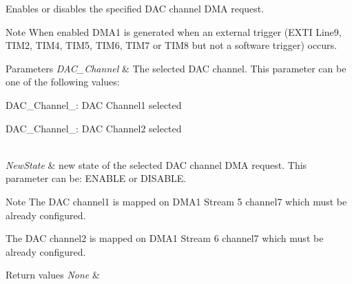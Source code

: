 Enables or disables the specified D\+AC channel D\+MA request. 

\begin{DoxyNote}{Note}
When enabled D\+M\+A1 is generated when an external trigger (E\+X\+TI Line9, T\+I\+M2, T\+I\+M4, T\+I\+M5, T\+I\+M6, T\+I\+M7 or T\+I\+M8 but not a software trigger) occurs. 
\end{DoxyNote}

\begin{DoxyParams}{Parameters}
{\em D\+A\+C\+\_\+\+Channel} & The selected D\+AC channel. This parameter can be one of the following values\+: \begin{DoxyItemize}
\item D\+A\+C\+\_\+\+Channel\+\_\+: D\+AC Channel1 selected \item D\+A\+C\+\_\+\+Channel\+\_\+: D\+AC Channel2 selected \end{DoxyItemize}
\\
\hline
{\em New\+State} & new state of the selected D\+AC channel D\+MA request. This parameter can be\+: E\+N\+A\+B\+LE or D\+I\+S\+A\+B\+LE. \\
\hline
\end{DoxyParams}
\begin{DoxyNote}{Note}
The D\+AC channel1 is mapped on D\+M\+A1 Stream 5 channel7 which must be already configured. 

The D\+AC channel2 is mapped on D\+M\+A1 Stream 6 channel7 which must be already configured. 
\end{DoxyNote}

\begin{DoxyRetVals}{Return values}
{\em None} & \\
\hline
\end{DoxyRetVals}
